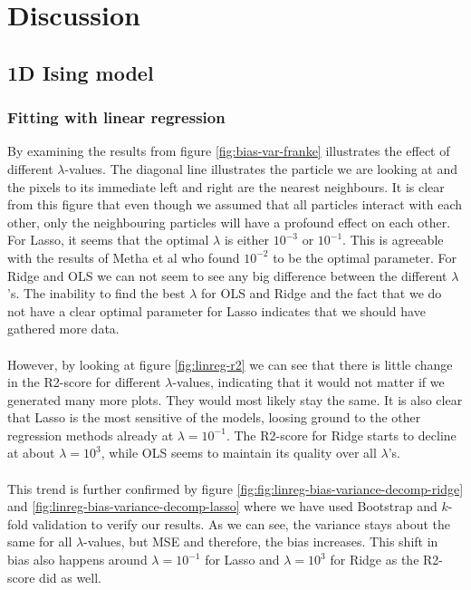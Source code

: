 \section{Discussion}

\subsection{1D Ising model}
\subsubsection{Fitting with linear regression}
By examining the results from figure \ref{fig:bias-var-franke} illustrates the effect of different $\lambda$-values. The diagonal line illustrates the particle we are looking at and the pixels to its immediate left and right are the nearest neighbours. It is clear from this figure that even though we assumed that all particles interact with each other, only the neighbouring particles will have a profound effect on each other. For Lasso, it seems that the optimal $\lambda$ is either $10^{-3}$ or $10^{-1}$. This is agreeable with the results of Metha et al \cite{2018arXiv180308823M} who found $10^{-2}$ to be the optimal parameter. For Ridge and OLS we can not seem to see any big difference between the different $\lambda$'s. The inability to find the best $\lambda$ for OLS and Ridge and the fact that we do not have a clear optimal parameter for Lasso indicates that we should have gathered more data. \\ \\
However, by looking at figure \ref{fig:linreg-r2} we can see that there is little change in the R2-score for different $\lambda$-values, indicating that it would not matter if we generated many more plots. They would most likely stay the same. It is also clear that Lasso is the most sensitive of the models, loosing ground to the other regression methods already at $\lambda = 10^{-1}$. The R2-score for Ridge starts to decline at about $\lambda = 10^{3}$, while OLS seems to maintain its quality over all $\lambda$'s. \\ \\
This trend is further confirmed by figure \ref{fig:fig:linreg-bias-variance-decomp-ridge} and \ref{fig:linreg-bias-variance-decomp-lasso} where we have used Bootstrap and $k$-fold validation to verify our results. As we can see, the variance stays about the same for all $\lambda$-values, but MSE and therefore, the bias increases. This shift in bias also happens around $\lambda = 10^{-1}$ for Lasso and $\lambda = 10^{3}$ for Ridge as the R2-score did as well.
